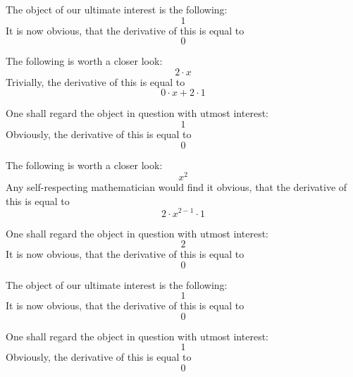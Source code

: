 \documentclass{article}
\begin{document}
The object of our ultimate interest is the following:
\begin{equation}
1 
\end{equation}
It is now obvious, that the derivative of this is equal to
\begin{equation}
0 
\end{equation}

The following is worth a closer look:
\begin{equation}
2 \cdot x 
\end{equation}
Trivially, the derivative of this is equal to
\begin{equation}
0 \cdot x + 2 \cdot 1 
\end{equation}

One shall regard the object in question with utmost interest:
\begin{equation}
1 
\end{equation}
Obviously, the derivative of this is equal to
\begin{equation}
0 
\end{equation}

The following is worth a closer look:
\begin{equation}
x ^{2 } 
\end{equation}
Any self-respecting mathematician would find it obvious, that the derivative of this is equal to
\begin{equation}
2 \cdot x ^{2 - 1 } \cdot 1 
\end{equation}

One shall regard the object in question with utmost interest:
\begin{equation}
2 
\end{equation}
It is now obvious, that the derivative of this is equal to
\begin{equation}
0 
\end{equation}

The object of our ultimate interest is the following:
\begin{equation}
1 
\end{equation}
It is now obvious, that the derivative of this is equal to
\begin{equation}
0 
\end{equation}

One shall regard the object in question with utmost interest:
\begin{equation}
1 
\end{equation}
Obviously, the derivative of this is equal to
\begin{equation}
0 
\end{equation}
\end{document}
